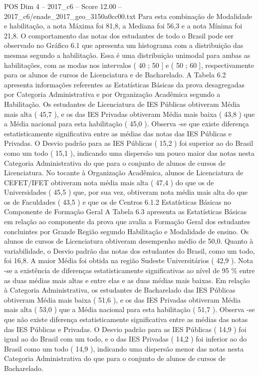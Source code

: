 \begin{textsample}{POS Dim 4 – 2017\_c6 – Score 12.00 – 2017\_c6/enade\_2017\_geo\_3150a0cc00.txt}
Para esta combinação de Modalidade e habilitação, a nota Máxima foi 81,8, a Mediana foi 56,3 e a nota Mínima foi 21,8.
O comportamento das notas dos estudantes de todo o Brasil pode ser observado no Gráfico 6.1 que apresenta um histograma com a distribuição das mesmas segundo a habilitação.
Essa é uma distribuição unimodal para ambas as habilitações, com as modas nos intervalos ( 40 ; 50 ] e ( 50 ; 60 ], respectivamente para os alunos de cursos de Licenciatura e de Bacharelado.
A Tabela 6.2 apresenta informações referentes as Estatísticas Básicas da prova desagregadas por Categoria Administrativa e por Organização Acadêmica segundo a Habilitação.
Os estudantes de Licenciatura de IES Públicas obtiveram Média mais alta ( 45,7 ), e os das IES Privadas obtiveram Média mais baixa ( 43,8 ) que a Média nacional para esta habilitação ( 45,0 ).
Observa -se que existe diferença estatisticamente significativa entre as médias das notas das IES Públicas e Privadas.
O Desvio padrão para as IES Públicas ( 15,2 ) foi superior ao do Brasil como um todo ( 15,1 ), indicando uma dispersão um pouco maior das notas nesta Categoria Administrativa do que para o conjunto de alunos de cursos de Licenciatura.
No tocante à Organização Acadêmica, alunos de Licenciatura de CEFET/IFET obtiveram nota média mais alta ( 47,4 ) do que os de Universidades ( 45,5 ) que, por sua vez, obtiveram nota média mais alta do que os de Faculdades ( 43,5 ) e que os de Centros 6.1.2 Estatísticas Básicas no Componente de Formação Geral A Tabela 6.3 apresenta as Estatísticas Básicas em relação ao componente da prova que avalia a Formação Geral dos estudantes concluintes por Grande Região segundo Habilitação e Modalidade de ensino.
Os alunos de cursos de Licenciatura obtiveram desempenho médio de 50,0.
Quanto à variabilidade, o Desvio padrão das notas dos estudantes do Brasil, como um todo, foi 16,8.
A maior Média foi obtida na região Sudeste Universitários ( 42,9 ).
Nota -se a existência de diferenças estatisticamente significativas ao nível de 95 \% entre as duas médias mais altas e entre elas e as duas médias mais baixas.
Em relação à Categoria Administrativa, os estudantes de Bacharelado das IES Públicas obtiveram Média mais baixa ( 51,6 ), e os das IES Privadas obtiveram Média mais alta ( 53,0 ) que a Média nacional para esta habilitação ( 51,7 ).
Observa -se que não existe diferença estatisticamente significativa entre as médias das notas das IES Públicas e Privadas.
O Desvio padrão para as IES Públicas ( 14,9 ) foi igual ao do Brasil com um todo, e o das IES Privadas ( 14,2 ) foi inferior ao do Brasil como um todo ( 14,9 ), indicando uma dispersão menor das notas nesta Categoria Administrativa do que para o conjunto de alunos de cursos de Bacharelado.

\end{textsample}
